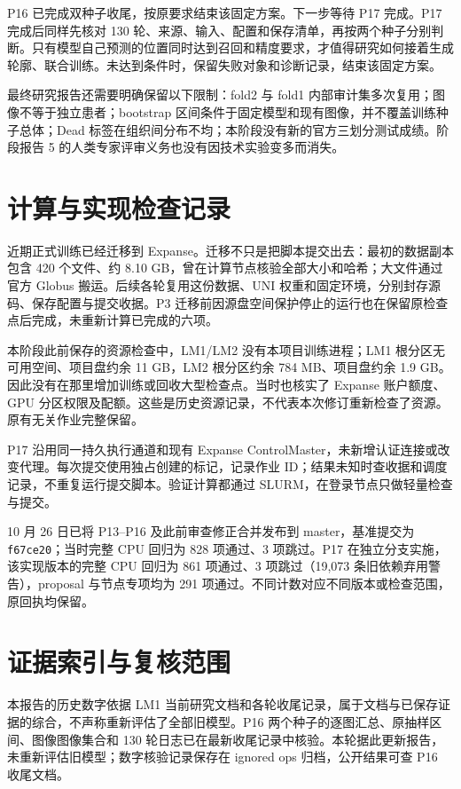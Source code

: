 \documentclass[UTF8,zihao=-4,fontset=windows]{ctexart}
\begin{document}
P16 已完成双种子收尾，按原要求结束该固定方案。下一步等待 P17 完成。P17 完成后同样先核对 130 轮、来源、输入、配置和保存清单，再按两个种子分别判断。只有模型自己预测的位置同时达到召回和精度要求，才值得研究如何接着生成轮廓、联合训练。未达到条件时，保留失败对象和诊断记录，结束该固定方案。

最终研究报告还需要明确保留以下限制：fold2 与 fold1 内部审计集多次复用；图像不等于独立患者；bootstrap 区间条件于固定模型和现有图像，并不覆盖训练种子总体；Dead 标签在组织间分布不均；本阶段没有新的官方三划分测试成绩。阶段报告 5 的人类专家评审义务也没有因技术实验变多而消失。

\clearpage
\appendix
\section{计算与实现检查记录}

近期正式训练已经迁移到 Expanse。迁移不只是把脚本提交出去：最初的数据副本包含 420 个文件、约 8.10 GB，曾在计算节点核验全部大小和哈希；大文件通过官方 Globus 搬运。后续各轮复用这份数据、UNI 权重和固定环境，分别封存源码、保存配置与提交收据。P3 迁移前因源盘空间保护停止的运行也在保留原检查点后完成，未重新计算已完成的六项。

本阶段此前保存的资源检查中，LM1/LM2 没有本项目训练进程；LM1 根分区无可用空间、项目盘约余 11 GB，LM2 根分区约余 784 MB、项目盘约余 1.9 GB。因此没有在那里增加训练或回收大型检查点。当时也核实了 Expanse 账户额度、GPU 分区权限及配额。这些是历史资源记录，不代表本次修订重新检查了资源。原有无关作业完整保留。

P17 沿用同一持久执行通道和现有 Expanse ControlMaster，未新增认证连接或改变代理。每次提交使用独占创建的标记，记录作业 ID；结果未知时查收据和调度记录，不重复运行提交脚本。验证计算都通过 SLURM，在登录节点只做轻量检查与提交。

10 月 26 日已将 P13--P16 及此前审查修正合并发布到 master，基准提交为 \texttt{f67ce20}；当时完整 CPU 回归为 828 项通过、3 项跳过。P17 在独立分支实施，该实现版本的完整 CPU 回归为 861 项通过、3 项跳过（19,073 条旧依赖弃用警告），proposal 与节点专项均为 291 项通过。不同计数对应不同版本或检查范围，原回执均保留。



\section{证据索引与复核范围}

本报告的历史数字依据 LM1 当前研究文档和各轮收尾记录，属于文档与已保存证据的综合，不声称重新评估了全部旧模型。P16 两个种子的逐图汇总、原抽样区间、图像图像集合和 130 轮日志已在最新收尾记录中核验。本轮据此更新报告，未重新评估旧模型；数字核验记录保存在 ignored ops 归档，公开结果可查 P16 收尾文档。
\end{document}
